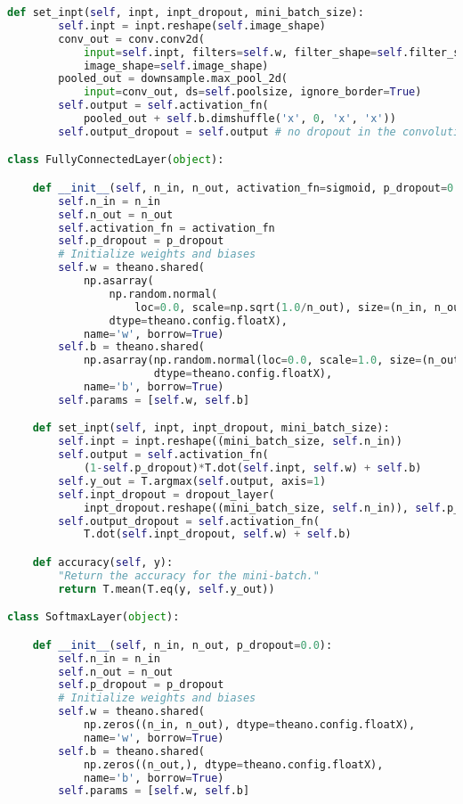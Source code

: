 \begin{lstlisting}[language=Python]
    def set_inpt(self, inpt, inpt_dropout, mini_batch_size):
        self.inpt = inpt.reshape(self.image_shape)
        conv_out = conv.conv2d(
            input=self.inpt, filters=self.w, filter_shape=self.filter_shape,
            image_shape=self.image_shape)
        pooled_out = downsample.max_pool_2d(
            input=conv_out, ds=self.poolsize, ignore_border=True)
        self.output = self.activation_fn(
            pooled_out + self.b.dimshuffle('x', 0, 'x', 'x'))
        self.output_dropout = self.output # no dropout in the convolutional layers

class FullyConnectedLayer(object):

    def __init__(self, n_in, n_out, activation_fn=sigmoid, p_dropout=0.0):
        self.n_in = n_in
        self.n_out = n_out
        self.activation_fn = activation_fn
        self.p_dropout = p_dropout
        # Initialize weights and biases
        self.w = theano.shared(
            np.asarray(
                np.random.normal(
                    loc=0.0, scale=np.sqrt(1.0/n_out), size=(n_in, n_out)),
                dtype=theano.config.floatX),
            name='w', borrow=True)
        self.b = theano.shared(
            np.asarray(np.random.normal(loc=0.0, scale=1.0, size=(n_out,)),
                       dtype=theano.config.floatX),
            name='b', borrow=True)
        self.params = [self.w, self.b]

    def set_inpt(self, inpt, inpt_dropout, mini_batch_size):
        self.inpt = inpt.reshape((mini_batch_size, self.n_in))
        self.output = self.activation_fn(
            (1-self.p_dropout)*T.dot(self.inpt, self.w) + self.b)
        self.y_out = T.argmax(self.output, axis=1)
        self.inpt_dropout = dropout_layer(
            inpt_dropout.reshape((mini_batch_size, self.n_in)), self.p_dropout)
        self.output_dropout = self.activation_fn(
            T.dot(self.inpt_dropout, self.w) + self.b)

    def accuracy(self, y):
        "Return the accuracy for the mini-batch."
        return T.mean(T.eq(y, self.y_out))

class SoftmaxLayer(object):

    def __init__(self, n_in, n_out, p_dropout=0.0):
        self.n_in = n_in
        self.n_out = n_out
        self.p_dropout = p_dropout
        # Initialize weights and biases
        self.w = theano.shared(
            np.zeros((n_in, n_out), dtype=theano.config.floatX),
            name='w', borrow=True)
        self.b = theano.shared(
            np.zeros((n_out,), dtype=theano.config.floatX),
            name='b', borrow=True)
        self.params = [self.w, self.b]


\end{lstlisting}
